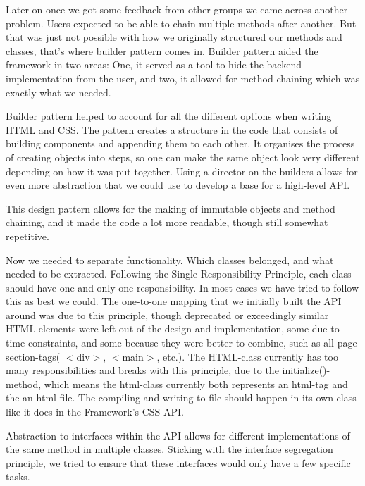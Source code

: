 \documentclass[12pt]{article}
\begin{document}
    Later on once we got some feedback from other groups we came across another problem. Users expected to be able to chain multiple methods after another. But that was just not possible with how we originally structured our methods and classes, that's where builder pattern comes in. Builder pattern aided the framework in two areas: One, it served as a tool to hide the backend-implementation from the user, and two, it allowed for method-chaining which was exactly what we needed.

    Builder pattern helped to account for all the different options when writing HTML and CSS. The pattern creates a structure in the code that consists of building components and appending them to each other. It organises the process of creating objects into steps, so one can make the same object look very different depending on how it was put together. Using a director on the builders allows for even more abstraction that we could use to develop a base for a high-level API.

    This design pattern allows for the making of immutable objects and method chaining, and it made the code a lot more readable, though still somewhat repetitive.
    
    Now we needed to separate functionality. Which classes belonged, and what needed to be extracted. Following the Single Responsibility Principle, each class should have one and only one responsibility. In most cases we have tried to follow this as best we could. The one-to-one mapping that we initially built the API around was due to this principle, though deprecated or exceedingly similar HTML-elements were left out of the design and implementation, some due to time constraints, and some because they were better to combine, such as all page section-tags( $<$div$>$, $<$main$>$, etc.). The HTML-class currently has too many responsibilities and breaks with this principle, due to the initialize()-method, which means the html-class currently both represents an html-tag and the an html file. The compiling and writing to file should happen in its own class like it does in the Framework’s CSS API.

    Abstraction to interfaces within the API allows for different implementations of the same method in multiple classes. Sticking with the interface segregation principle, we tried to ensure that these interfaces would only have a few specific tasks. 
\end{document}
